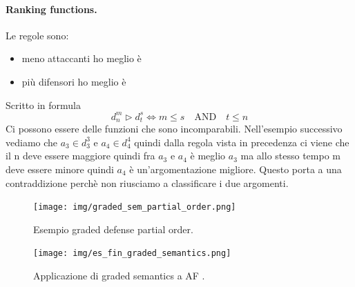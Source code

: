 \paragraph{Ranking functions.} Le regole sono:
\begin{itemize}
    \item meno attaccanti ho meglio è
    \item più difensori ho meglio è
\end{itemize}
Scritto in formula 
\[d_n^m \triangleright  d_t^s \iff m \leq s \quad \text{AND} \quad t \leq n\]
Ci possono essere delle funzioni che sono incomparabili. Nell'esempio successivo vediamo che $a_3 \in d_3^3$ e $a_4 \in d_4^4$ quindi dalla regola vista in precedenza ci viene che il n deve essere maggiore quindi fra $a_3$ e $a_4$ è meglio $a_3$ ma allo stesso tempo m deve essere minore quindi $a_4$ è un'argomentazione migliore. Questo porta a una contraddizione perchè non riusciamo a classificare i due argomenti. 
\begin{figure}[H]
    \centering
    \texttt{[image: img/graded\_sem\_partial\_order.png]}
    \caption{Esempio graded defense partial order.}\label{fig:es_graded_defense_partial order}
\end{figure}

\begin{figure}[H]
    \centering
    \texttt{[image: img/es\_fin\_graded\_semantics.png]}
    \caption{Applicazione di graded semantics a AF .}\label{fig:es_fin_graded_semantics}
\end{figure}
